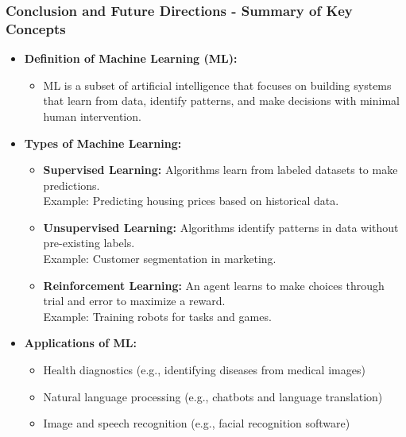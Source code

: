 \documentclass[aspectratio=169]{beamer}
\begin{document}
\begin{frame}[fragile]
    \frametitle{Conclusion and Future Directions - Summary of Key Concepts}
    \begin{itemize}
        \item \textbf{Definition of Machine Learning (ML):} 
        \begin{itemize}
            \item ML is a subset of artificial intelligence that focuses on building systems that learn from data, identify patterns, and make decisions with minimal human intervention.
        \end{itemize}
        
        \item \textbf{Types of Machine Learning:}
        \begin{itemize}
            \item \textbf{Supervised Learning:} Algorithms learn from labeled datasets to make predictions. \\
            Example: Predicting housing prices based on historical data.
            \item \textbf{Unsupervised Learning:} Algorithms identify patterns in data without pre-existing labels. \\
            Example: Customer segmentation in marketing.
            \item \textbf{Reinforcement Learning:} An agent learns to make choices through trial and error to maximize a reward. \\
            Example: Training robots for tasks and games.
        \end{itemize}
        
        \item \textbf{Applications of ML:}
        \begin{itemize}
            \item Health diagnostics (e.g., identifying diseases from medical images)
            \item Natural language processing (e.g., chatbots and language translation)
            \item Image and speech recognition (e.g., facial recognition software)
        \end{itemize}
    \end{itemize}
\end{frame}
\end{document}
